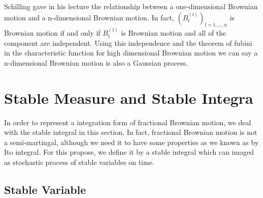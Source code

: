 \documentclass[a4paper, twoside, 11pt]{article}
\theoremstyle{definition}
\newtheorem{lemma}[definition]{\scshape Lemma}
\begin{document}
Schilling gave in his lecture \cite{shilling} the relationship between a one-dimensional Brownian motion and a n-dimensional Brownian motion.
In fact, $(B_t^{(l)})_{l=1,\dots,n}$ is Brownian motion if and only if $B_t^{(l)}$ is Brownian motion and all of the component are independent. Using this independence and the theorem of fubini in the characteristic function for high dimensional Brownian motion we can say a n-dimensional Brownian motion is also a Gaussian process.

\newpage

\section{Stable Measure and Stable Integra}
In order to represent a integration form of fractional Brownian motion, we deal with the stable integral in this section. In fact, fractional Brownian motion is not a semi-martingal, although we need it to have some properties as we known as by Ito integral. For this propose, we define it by a 
stable integral which can imaged as stochastic process of stable variables on time.

\subsection{Stable Variable}

\end{document}
